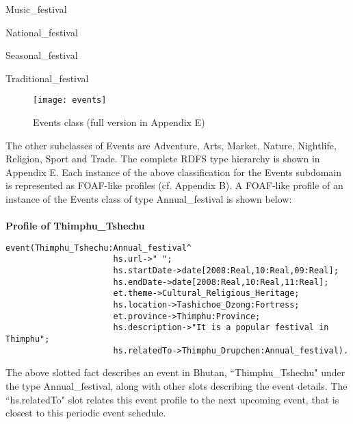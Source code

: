 \hspace{20mm}Music\_festival

\hspace{20mm}National\_festival

\hspace{20mm}Seasonal\_festival

\hspace{20mm}Traditional\_festival\\

\begin{figure}
\texttt{[image: events]}
\caption {Events class (full version in Appendix E)}
\label{fig:Fig4.2}
\end{figure}


\doublespacing
\hspace{0.3in}The other subclasses of Events are Adventure, Arts, Market, Nature, Nightlife, Religion, Sport and Trade. The complete RDFS type hierarchy is shown in Appendix E. Each instance of the above classification for the Events subdomain is represented as FOAF-like profiles (cf. Appendix B). A FOAF-like profile of an instance of the Events class of type Annual\_festival is shown below:
\\
\\

\textbf{Profile of Thimphu\_Tshechu}

\begin{small}
\singlespacing
\begin{verbatim} 
event(Thimphu_Tshechu:Annual_festival^
                      hs.url->" ";
                      hs.startDate->date[2008:Real,10:Real,09:Real];
                      hs.endDate->date[2008:Real,10:Real,11:Real];
                      et.theme->Cultural_Religious_Heritage;
                      hs.location->Tashichoe_Dzong:Fortress;
                      et.province->Thimphu:Province;
                      hs.description->"It is a popular festival in Thimphu";
                      hs.relatedTo->Thimphu_Drupchen:Annual_festival).  
\end{verbatim}
\end{small}

\hspace{0.3in}The above slotted fact describes an event in Bhutan, ``Thimphu\_Tshechu" under the type Annual\_festival, along with other slots describing the event details. The ``hs.relatedTo" slot relates this event profile to the next upcoming event,  that is closest to this periodic event schedule. 


